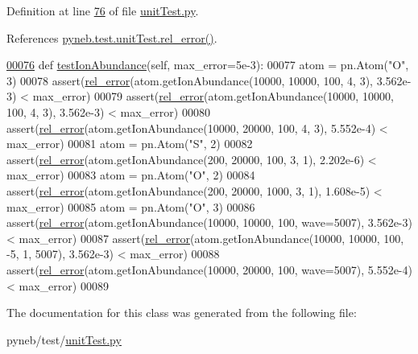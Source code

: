 Definition at line \hyperlink{unit_test_8py_source_l00076}{76} of file \hyperlink{unit_test_8py_source}{unit\+Test.\+py}.



References \hyperlink{unit_test_8py_source_l00005}{pyneb.\+test.\+unit\+Test.\+rel\+\_\+error()}.


\begin{DoxyCode}
\hypertarget{classpyneb_1_1test_1_1unit_test_1_1_unit_test_l00076}{}\hyperlink{classpyneb_1_1test_1_1unit_test_1_1_unit_test_a7a316a645d962527433b1e5b4de4f5ce}{00076}         \textcolor{keyword}{def }\hyperlink{classpyneb_1_1test_1_1unit_test_1_1_unit_test_a7a316a645d962527433b1e5b4de4f5ce}{testIonAbundance}(self, max\_error=5e-3):
00077                 atom = pn.Atom(\textcolor{stringliteral}{"O"}, 3)
00078                 assert(\hyperlink{namespacepyneb_1_1test_1_1unit_test_aff3b7f847905c444d8b10727f10de236}{rel\_error}(atom.getIonAbundance(10000, 10000, 100, 4, 3), 3.562e-3) < 
      max\_error)
00079                 assert(\hyperlink{namespacepyneb_1_1test_1_1unit_test_aff3b7f847905c444d8b10727f10de236}{rel\_error}(atom.getIonAbundance(10000, 10000, 100, 4, 3), 3.562e-3) < 
      max\_error)
00080                 assert(\hyperlink{namespacepyneb_1_1test_1_1unit_test_aff3b7f847905c444d8b10727f10de236}{rel\_error}(atom.getIonAbundance(10000, 20000, 100, 4, 3), 5.552e-4) < 
      max\_error)
00081                 atom = pn.Atom(\textcolor{stringliteral}{"S"}, 2)
00082                 assert(\hyperlink{namespacepyneb_1_1test_1_1unit_test_aff3b7f847905c444d8b10727f10de236}{rel\_error}(atom.getIonAbundance(200, 20000, 100, 3, 1), 2.202e-6) < 
      max\_error)
00083                 atom = pn.Atom(\textcolor{stringliteral}{"O"}, 2)
00084                 assert(\hyperlink{namespacepyneb_1_1test_1_1unit_test_aff3b7f847905c444d8b10727f10de236}{rel\_error}(atom.getIonAbundance(200, 20000, 1000, 3, 1), 1.608e-5) < 
      max\_error)
00085                 atom = pn.Atom(\textcolor{stringliteral}{"O"}, 3)
00086                 assert(\hyperlink{namespacepyneb_1_1test_1_1unit_test_aff3b7f847905c444d8b10727f10de236}{rel\_error}(atom.getIonAbundance(10000, 10000, 100, wave=5007), 3.562e-3) < 
      max\_error)
00087                 assert(\hyperlink{namespacepyneb_1_1test_1_1unit_test_aff3b7f847905c444d8b10727f10de236}{rel\_error}(atom.getIonAbundance(10000, 10000, 100, -5, 1, 5007), 3.562e-3) <
       max\_error)
00088                 assert(\hyperlink{namespacepyneb_1_1test_1_1unit_test_aff3b7f847905c444d8b10727f10de236}{rel\_error}(atom.getIonAbundance(10000, 20000, 100, wave=5007), 5.552e-4) < 
      max\_error)
00089 
\end{DoxyCode}


The documentation for this class was generated from the following file\+:\begin{DoxyCompactItemize}
\item 
pyneb/test/\hyperlink{unit_test_8py}{unit\+Test.\+py}\end{DoxyCompactItemize}
